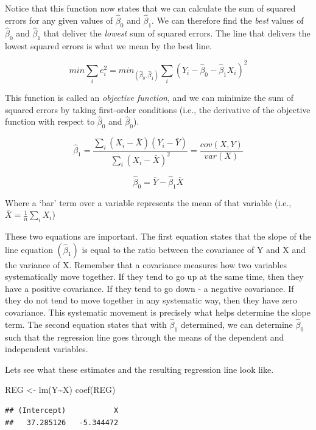 \documentclass[
]{book}
\newenvironment{Shaded}{\begin{snugshade}}{\end{snugshade}}
\newcommand{\FunctionTok}[1]{\textcolor[rgb]{0.00,0.00,0.00}{#1}}
\newcommand{\NormalTok}[1]{#1}
\newcommand{\OtherTok}[1]{\textcolor[rgb]{0.56,0.35,0.01}{#1}}
\newcommand{\SpecialCharTok}[1]{\textcolor[rgb]{0.00,0.00,0.00}{#1}}
\begin{document}
Notice that this function now states that we can calculate the sum of squared errors for any given values of \(\hat{\beta}_0\) and \(\hat{\beta}_1\). We can therefore find the \emph{best} values of \(\hat{\beta}_0\) and \(\hat{\beta}_1\) that deliver the \emph{lowest} sum of squared errors. The line that delivers the lowest squared errors is what we mean by the best line.

\[min\sum_{i}e^2_i = min_{(\hat{\beta}_0,\hat{\beta}_1)}\sum_{i}(Y_i - \hat{\beta}_0 - \hat{\beta}_1X_i)^2\]

This function is called an \emph{objective function}, and we can minimize the sum of squared errors by taking first-order conditions (i.e., the derivative of the objective function with respect to \(\hat{\beta}_0\) and \(\hat{\beta}_0\)).

\[\hat{\beta}_1=\frac{\sum_i (X_i-\bar{X})(Y_i-\bar{Y})}{\sum_i(X_i-\bar{X})^2}=\frac{cov(X,Y)}{var(X)}\]

\[\hat{\beta}_0=\bar{Y}-\hat{\beta}_1\bar{X}\]

Where a `bar' term over a variable represents the mean of that variable (i.e., \(\bar{X}=\frac{1}{n}\sum_iX_i\))

These two equations are important. The first equation states that the slope of the line equation \((\hat{\beta}_1)\) is equal to the ratio between the covariance of Y and X and the variance of X. Remember that a covariance measures how two variables systematically move together. If they tend to go up at the same time, then they have a positive covariance. If they tend to go down - a negative covariance. If they do not tend to move together in any systematic way, then they have zero covariance. This systematic movement is precisely what helps determine the slope term. The second equation states that with \(\hat{\beta}_1\) determined, we can determine \(\hat{\beta}_0\) such that the regression line goes through the means of the dependent and independent variables.

Lets see what these estimates and the resulting regression line look like.

\begin{Shaded}
\begin{Highlighting}[]
\NormalTok{REG }\OtherTok{\textless{}{-}} \FunctionTok{lm}\NormalTok{(Y}\SpecialCharTok{\textasciitilde{}}\NormalTok{X)}
\FunctionTok{coef}\NormalTok{(REG)}
\end{Highlighting}
\end{Shaded}

\begin{verbatim}
## (Intercept)           X 
##   37.285126   -5.344472
\end{verbatim}
\end{document}
